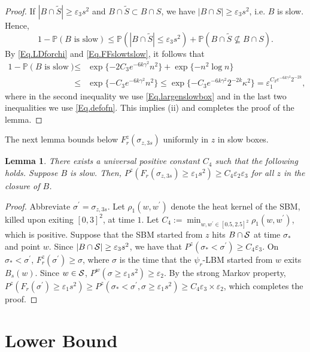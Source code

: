 \documentclass[11pt]{article}
\newtheorem{lemma}[theorem]{Lemma}
\theoremstyle{definition}
\def \e {\varepsilon}
\def \k {\kappa}
\def \P {{\mathbb{P}}}
\def \s {\sigma}
\def \ss {{\cal S}}
\begin{document}
\begin{proof}
\medskip

 If $|B \cap \tilde S| \ge \e_3 s^2$ and $B \cap \tilde S \subset B \cap S$, we have $|B \cap S| \ge \e_3 s^2$, i.e. $B$ is slow. Hence,
 $$
1 - \P (B \mbox{ is slow}) \le \P (|B \cap \tilde S| \le \e_3 s^2) + \P ( B \cap \tilde S \nsubseteq B \cap S ).
 $$
By \eqref{Eq.LDforchi} and \eqref{Eq.FFslowtslow}, it follows that
 \begin{eqnarray*}
1 - \P (B \mbox{ is slow})
 & \le &
\exp \{ - 2 C_3 e^{- 6 k \gamma^2} n^2 \} + \exp \{ - n^2 \log n \}
 \\ & \le &
\exp \{  - C_3 e^{- 6 k \gamma^2} n^2 \} \le \exp \{  - C_3 e^{- 6 k \gamma^2} 2^{- 2 k} \k^2 \} = \e_1^{C_3 e^{- 6 k \gamma^2} 2^{- 2k}} ,
  \end{eqnarray*}
where in the second inequality we use \eqref{Eq.largenslowbox} and in the last two inequalities we use \eqref{Eq.defofn}. This implies (ii) and completes the
proof of the lemma.
  \end{proof}

The next lemma bounds below $F_r^z (\sigma_{z, 3s})$ uniformly in $z$ in slow boxes.
 \begin{lemma} \label{Lemma.claim2}
There exists a universal positive constant  $C_4$ such that the following holds. Suppose $B$ is slow. Then, $P^z (F_r (  \s_{z,3s}) \ge \e_1 s^2) \ge C_4 \e_2 \e_3$ for all $z$ in the closure of $B$.
 \end{lemma}
 \begin{proof}
Abbreviate $\s^\prime = \s_{z,3s} $.
Let
$\rho_1 (w, w^\prime)$ denote the heat kernel of the SBM, killed
upon exiting $[0,3]^2$, at time $1$. Let $C_4 := \min_{ w, w^\prime \in [0.5, 2.5]^2} \rho_1 ( w, w^\prime )$, which is positive.
Suppose that
the SBM started
from $z$ hits $B \cap \ss$ at time $\s_*$ and point $w$. Since $|B \cap \ss|
\ge \e_3 s^2$, we have that
$P^z (\s_* < \s^\prime) \ge C_4 \e_3$. On $\s_* < \s^\prime$,
$F_r^z (\s^\prime) \ge \s $, where $\s $ is the time that the
$\psi_r$-LBM started
from $w$ exits $B_s (w)$. Since $w\in \ss$,
$P^w (\s \ge \e_1 s^2) \ge \e_2$. By the
strong Markov property, $P^z (F_r (\s^\prime) \ge \e_1 s^2)
\ge P^z (\s_* < \s^\prime, \s \ge \e_1 s^2) \ge C_4 \e_3 \times \e_2$,
which
completes the proof.
  \end{proof}

\section{Lower Bound}\label{Section.lowerbound}
\end{document}
